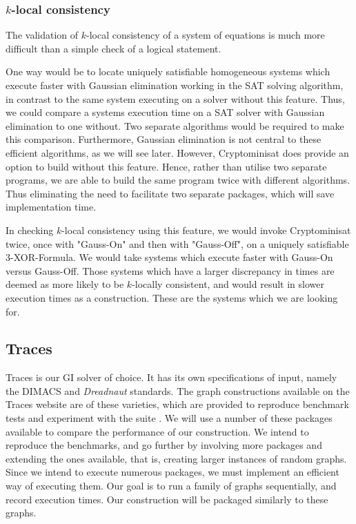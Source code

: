 \subsubsection{$k$-local consistency}
The validation of $k$-local consistency of a system of equations is much more difficult than a simple check of a logical statement. 
\par
One way would be to locate uniquely satisfiable homogeneous systems which execute faster with Gaussian elimination working in the SAT solving algorithm, in contrast to the same system executing on a solver without this feature. Thus, we could compare a systems execution time on a SAT solver with Gaussian elimination to one without. Two separate algorithms would be required to make this comparison. Furthermore, Gaussian elimination is not central to these efficient algorithms, as we will see later. However, Cryptominisat does provide an option to build without this feature. Hence, rather than utilise two separate programs, we are able to build the same program twice with different algorithms. Thus eliminating the need to facilitate two separate packages, which will save implementation time.
\par
In checking $k$-local consistency using this feature, we would invoke Cryptominisat twice, once with "Gauss-On" and then with "Gauss-Off", on a uniquely satisfiable 3-XOR-Formula. We would take systems which execute faster with Gauss-On versus Gauss-Off. Those systems which have a larger discrepancy in times are deemed as more likely to be $k$-locally consistent, and would result in slower execution times as a construction. These are the systems which we are looking for.  

\subsection{Traces}
Traces is our GI solver of choice. It has its own specifications of input, namely the DIMACS and \emph{Dreadnaut} standards. The graph constructions available on the Traces website are of these varieties, which are provided to reproduce benchmark tests and experiment with the suite \cite{piperno_2017}. We will use a number of these packages available to compare the performance of our construction. We intend to reproduce the benchmarks, and go further by involving more packages and extending the ones available, that is, creating larger instances of random graphs. Since we intend to execute numerous packages, we must implement an efficient way of executing them. Our goal is to run a family of graphs sequentially, and record execution times. Our construction will be packaged similarly to these graphs.

